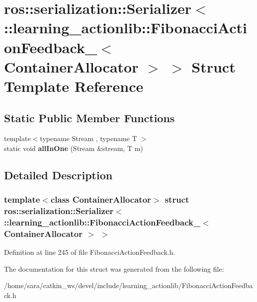 \hypertarget{structros_1_1serialization_1_1Serializer_3_01_1_1learning__actionlib_1_1FibonacciActionFeedback_fd662a58d6bbb8a4f34a74d895c83336}{}\section{ros\+:\+:serialization\+:\+:Serializer$<$ \+:\+:learning\+\_\+actionlib\+:\+:Fibonacci\+Action\+Feedback\+\_\+$<$ Container\+Allocator $>$ $>$ Struct Template Reference}
\label{structros_1_1serialization_1_1Serializer_3_01_1_1learning__actionlib_1_1FibonacciActionFeedback_fd662a58d6bbb8a4f34a74d895c83336}
\subsection*{Static Public Member Functions}
\begin{DoxyCompactItemize}
\item 
\mbox{\label{structros_1_1serialization_1_1Serializer_3_01_1_1learning__actionlib_1_1FibonacciActionFeedback_fd662a58d6bbb8a4f34a74d895c83336_a5275898ead5c30a921d0baa3a27d9742}} 
{\footnotesize template$<$typename Stream , typename T $>$ }\\static void {\bfseries all\+In\+One} (Stream \&stream, T m)
\end{DoxyCompactItemize}


\subsection{Detailed Description}
\subsubsection*{template$<$class Container\+Allocator$>$\newline
struct ros\+::serialization\+::\+Serializer$<$ \+::learning\+\_\+actionlib\+::\+Fibonacci\+Action\+Feedback\+\_\+$<$ Container\+Allocator $>$ $>$}



Definition at line 245 of file Fibonacci\+Action\+Feedback.\+h.



The documentation for this struct was generated from the following file\+:\begin{DoxyCompactItemize}
\item 
/home/sara/catkin\+\_\+ws/devel/include/learning\+\_\+actionlib/Fibonacci\+Action\+Feedback.\+h\end{DoxyCompactItemize}
